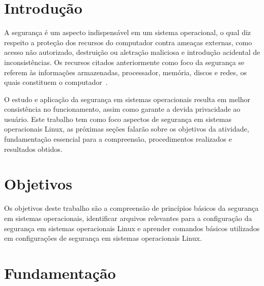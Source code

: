 \documentclass[
	12pt,				%
	oneside,   	        %
	a4paper,			%
	english,			%
	french,				%
	spanish,			%
	brazil,				%
	]{pacotes/abntex2}
\begin{document}
\tableofcontents*
\cleardoublepage

\textual

\makeatletter
\renewcommand{\chapter}{\@gobbletwo}
\makeatother

\section{Introdução}
\label{sec:introducao}

A segurança é um aspecto indispensável em um sistema operacional, o qual diz respeito a proteção dos recursos do computador contra ameaças externas, como acesso não autorizado, destruição ou aletração maliciosa e introdução acidental de inconsistências. Os recursos citados anteriormente como foco da segurança se referem às informações armazenadas, processador, memória, discos e redes, os quais constituem o computador~\cite{silberschatz2015}.

O estudo e aplicação da segurança em sistemas operacionais resulta em melhor consistência no funcionamento, assim como garante a devida privacidade ao usuário. Este trabalho tem como foco aspectos de segurança em sistemas operacionais Linux, as próximas seções falarão sobre os objetivos da atividade, fundamentação essencial para a compreensão, procedimentos realizados e resultados obtidos.

\section{Objetivos}
\label{sec:objetivos}

Os objetivos deste trabalho são a compreensão de princípios básicos da segurança em sistemas operacionais, identificar arquivos relevantes para a configuração da segurança em sistemas operacionais Linux e aprender comandos básicos utilizados em configurações de segurança em sistemas operacionais Linux.

\section{Fundamentação}
\label{sec:fundamentacao}
\end{document}
